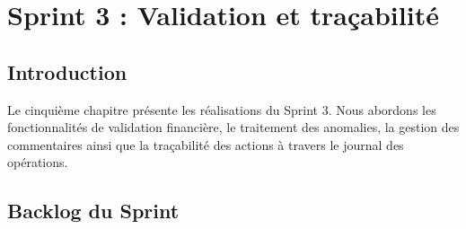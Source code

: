 \chapter{Sprint 3 : Validation et traçabilité}
\newpage
\section{Introduction}


Le cinquième chapitre présente les réalisations du Sprint 3. Nous abordons les fonctionnalités de validation financière, le traitement des anomalies, la gestion des commentaires ainsi que la traçabilité des actions à travers le journal des opérations.


\section{Backlog du Sprint}

\renewcommand{\arraystretch}{1.25}

